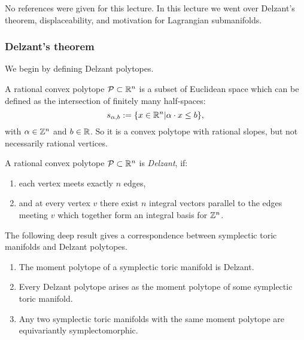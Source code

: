 No references were given for this lecture.
In this lecture we went over Delzant's theorem, displaceability, and motivation for Lagrangian submanifolds.


\subsubsection*{Delzant's theorem}

We begin by defining Delzant polytopes.

\begin{dfn}
	A rational convex polytope $\mathcal{P}\subset\mathbb{R}^n$ is a subset of Euclidean space which can be defined as the intersection of finitely many half-spaces:
	\[s_{\alpha,b}:=\{x\in\mathbb{R}^n|\alpha\cdot x\le b\},\]
	with $\alpha\in\mathbb{Z}^n$ and $b\in\mathbb{R}$.
	So it is a convex polytope with rational slopes, but not necessarily rational vertices.
\end{dfn}

\begin{dfn}
	A rational convex polytope $\mathcal{P}\subset\mathbb{R}^n$ is \emph{Delzant}, if:
	\begin{enumerate}
		\item each vertex meets exactly $n$ edges,
		\item and at every vertex $v$ there exist $n$ integral vectors parallel to the edges meeting $v$ which together form an integral basis for $\mathbb{Z}^n$.
	\end{enumerate}
\end{dfn}

\begin{example}
\end{example}

The following deep result gives a correspondence between symplectic toric manifolds and Delzant polytopes.
\begin{thm}
	\begin{enumerate}
	\item The moment polytope of a symplectic toric manifold is Delzant.
	\item Every Delzant polytope arises as the moment polytope of some symplectic toric manifold.
	\item Any two symplectic toric manifolds with the same moment polytope are equivariantly symplectomorphic.
	\end{enumerate}
\end{thm}

